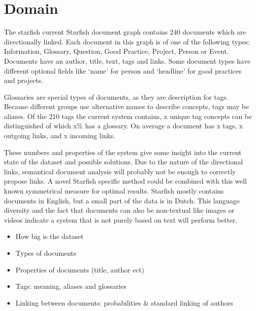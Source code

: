

\section{Domain}
The starfish current Starfish document graph contains 240 documents which are directionally linked. Each document in this graph is of one of the following types: Information, Glossary, Question, Good Practice, Project, Person or Event. Documents have an author, title, text, tags and links. Some document types have different optional fields like `name' for person and `headline' for good practices and projects. 

Glossaries are special types of documents, as they are description for tags. Because different groups use alternative names to describe concepts, tags may be aliases. Of the 210 tags the current system contains, x unique tag concepts can be distinguished of which x\% has a glossary. On average a document has x tags, x outgoing links, and x incoming links.

These numbers and properties of the system give some insight into the current state of the dataset and possible solutions. Due to the nature of the directional links, semantical document analysis will probably not be enough to correctly propose links. A novel Starfish specific method could be combined with this well known symmetrical measure for optimal results. Starfish mostly contains documents in English, but a small part of the data is in Dutch. This language diversity and the fact that documents can also be non-textual like images or videos indicate a system that is not purely based on text will perform better.



\begin{itemize}
\item How big is the dataset
\item Types of documents
\item Properties of documents (title, author ect)
\item Tags: meaning, aliases and glossaries
\item Linking between documents: probabilities \& standard linking of authors
\end{itemize}
